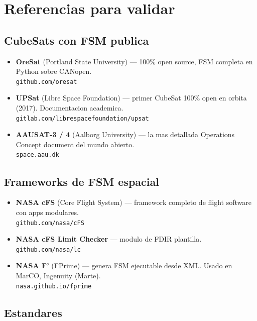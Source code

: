\documentclass[11pt,a4paper,oneside,openright]{book}
\begin{document}
\chapter{Referencias para validar}

\section*{CubeSats con FSM publica}

\begin{itemize}[leftmargin=2em]
  \item \textbf{OreSat} (Portland State University) --- 100\% open
    source, FSM completa en Python sobre CANopen.\\
    \texttt{github.com/oresat}
  \item \textbf{UPSat} (Libre Space Foundation) --- primer CubeSat
    100\% open en orbita (2017). Documentacion academica.\\
    \texttt{gitlab.com/librespacefoundation/upsat}
  \item \textbf{AAUSAT-3 / 4} (Aalborg University) --- la mas
    detallada Operations Concept document del mundo abierto.\\
    \texttt{space.aau.dk}
\end{itemize}

\section*{Frameworks de FSM espacial}

\begin{itemize}[leftmargin=2em]
  \item \textbf{NASA cFS} (Core Flight System) --- framework completo
    de flight software con apps modulares.\\
    \texttt{github.com/nasa/cFS}
  \item \textbf{NASA cFS Limit Checker} --- modulo de FDIR
    plantilla.\\
    \texttt{github.com/nasa/lc}
  \item \textbf{NASA F'} (FPrime) --- genera FSM ejecutable desde
    XML. Usado en MarCO, Ingenuity (Marte).\\
    \texttt{nasa.github.io/fprime}
\end{itemize}

\section*{Estandares}
\end{document}
